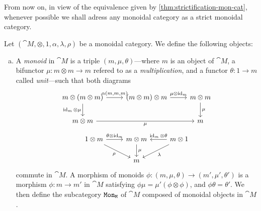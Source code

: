 \documentclass[../../deep-dive]{subfiles}
\begin{document}
From now on, in view of the equivalence given by
\cref{thm:strictification-mon-cat}, whenever possible we shall adress any
monoidal category as a strict monoidal category.

\begin{definition}
\label{def:(co)monoids}
Let \((\cat M, \otimes, 1, \alpha, \lambda, \rho)\) be a monoidal category. We
define the following objects:
\begin{enumerate}[(a)]\setlength\itemsep{0em}
\item A \emph{monoid} in \(\cat M\) is a triple \((m, \mu, \theta)\)---where
  \(m\) is an object of \(\cat M\), a bifunctor \(\mu: m \otimes m \to m\)
  refered to as a \emph{multiplication}, and a functor \(\theta: 1 \to m\)
  called \emph{unit}---such that both diagrams
  \[
  \begin{tikzcd}
  m \otimes (m \otimes m) \ar[d, "\Id_m \otimes \mu"']
  \ar[r, "{\alpha(m, m, m)}"]
  &(m \otimes m) \otimes m
  \ar[r, "\mu \otimes \Id_m"]
  &m \otimes m \ar[d, "\mu"] \\
  m \otimes m \ar[rr, "\mu"']
  &&m
  \end{tikzcd}
  \]
  \[
  \begin{tikzcd}
  1 \otimes m \ar[r, "\theta \otimes \Id_m"]
  \ar[rd, "\rho"']
  & m \otimes m \ar[d, "\mu"]
  &m \otimes 1
  \ar[l, "\Id_m \otimes \theta"']
  \ar[ld, "\lambda"] \\
  &m &
  \end{tikzcd}
  \]
  commute in \(\cat M\). A morphism of monoids
  \(\phi: (m, \mu, \theta) \to (m', \mu', \theta')\) is a morphism
  \(\phi: m \to m'\) in \(\cat M\) satisfying
  \(\phi \mu = \mu'(\phi \otimes \phi)\), and \(\phi \theta = \theta'\). We then
  define the subcategory \({\texttt{Mon}}_{\texttt M}\) of \(\cat M\) composed of monoidal
  objects in \(\cat M\).


\end{enumerate}
\end{definition}
\end{document}
